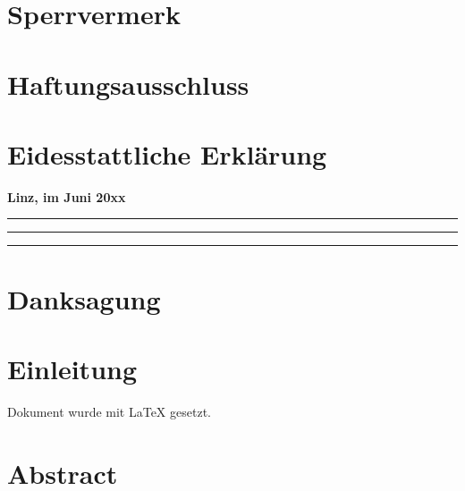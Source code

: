 \newcommand\signature[1]{%
\begin{center}\begin{minipage}{10cm}
    \centering
    \vspace{3cm}\par
    \noindent
    \hspace{1.5cm}\rule{10cm}{0.5pt}\par
    \noindent
    \hspace{3cm}\textbf{#1}
\end{minipage}\end{center}}

\section{Sperrvermerk}
\lipsum[1]

\vspace{2cm}

\section{Haftungsausschluss}
\lipsum[1]

\newpage

\section{Eidesstattliche Erklärung}
\lipsum[1]

\vspace{2cm}
\noindent
\textbf{Linz, im Juni 20xx}

\signature{\titlePageFullNameGp}
\signature{\titlePageFullNameMj}
\signature{\titlePageFullNameZb}

\newpage

\section{Danksagung}
\lipsum[1]

\newpage

\section{Einleitung}
Dokument wurde mit \LaTeX{} gesetzt.

\newpage

\section{Abstract}
\noindent
\lipsum[10]
